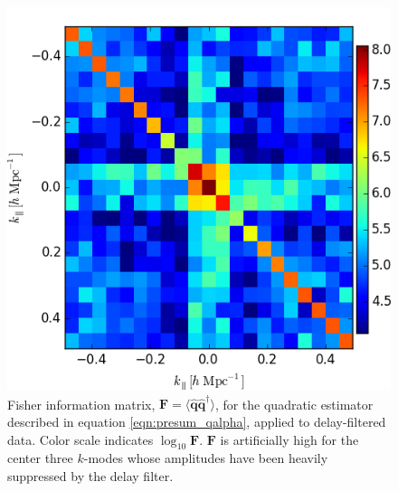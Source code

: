 \documentclass[twocolumn,numberedappendix]{emulateapj} \shorttitle{PSA64}
\newcommand{\qhat}{\hat{\mathbf{q}}}
\begin{document}
\begin{figure}[b!]\centering
\includegraphics[width=\columnwidth]{plots/fisher.png}
\caption{
Fisher information matrix, $\mathbf{F}=\langle\qhat\qhat^\dagger\rangle$, for the quadratic estimator described in
equation \ref{eqn:presum_qalpha}, applied to delay-filtered data. 
Color scale indicates $\log_{10}\mathbf{F}$.
$\mathbf{F}$ is artificially high for the center three $k$-modes whose amplitudes have been heavily
suppressed by the delay filter.
}


\label{fig:fisher}
\end{figure}
\end{document}
